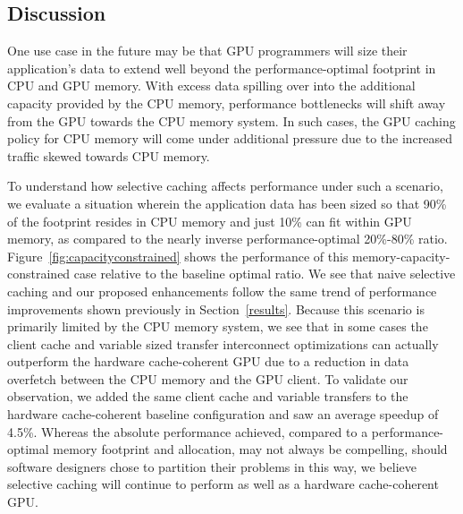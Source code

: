 \subsection {Discussion}
One use case in the future
may be that GPU programmers will size their application's data to extend well beyond
the performance-optimal footprint in CPU and GPU memory.  With excess data spilling over
into the additional capacity provided by the CPU memory, performance
bottlenecks will shift away from the GPU towards the CPU memory system.  In such
cases, the GPU caching policy for CPU memory will come under additional pressure due to
the increased traffic skewed towards CPU memory.

To understand how selective caching affects performance under such a scenario, we evaluate
a situation wherein the application data has been
sized so that 90\% of the footprint resides in CPU memory and just 10\% can fit within GPU memory, as compared to the nearly
inverse performance-optimal 20\%-80\% ratio.
Figure~\ref{fig:capacityconstrained} shows the performance of this memory-capacity-constrained case relative 
to the baseline optimal ratio.  We see that naive selective caching and
our proposed enhancements follow the same trend of performance improvements
shown previously in Section~\ref{results}.  Because this scenario is primarily limited
by the CPU memory system, we see that in some cases the client cache and variable sized transfer interconnect optimizations
can actually outperform the hardware cache-coherent GPU due to a reduction in data overfetch between the CPU memory and the GPU client.
To validate our observation, we added the same client cache and variable
transfers to the hardware cache-coherent baseline configuration and saw an average
speedup of 4.5\%.  Whereas the absolute
performance achieved, compared to a performance-optimal memory footprint and allocation, may not always be compelling, should
software designers chose to partition their problems in this way, we believe selective caching will continue to 
perform as well as a hardware cache-coherent GPU.

